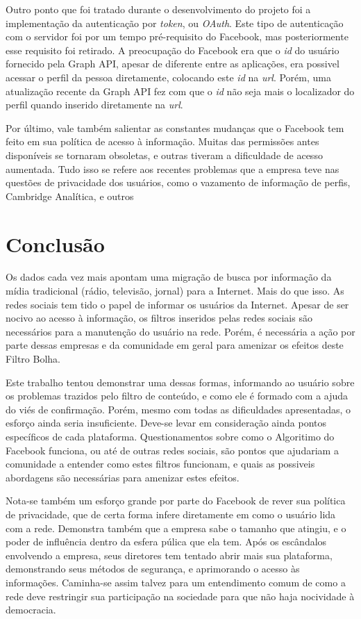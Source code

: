 \documentclass[
	12pt,				%
	oneside,			%
	a4paper,			%
	english,			%
	brazil				%
	]{abntex2ppgsi}
\begin{document}
Outro ponto que foi tratado durante o desenvolvimento do projeto foi a implementação da autenticação por \textit{token}, ou \textit{OAuth}. Este tipo de autenticação com o servidor foi por um tempo pré-requisito do Facebook, mas posteriormente esse requisito foi retirado. A preocupação do Facebook era que o \textit{id} do usuário fornecido pela Graph API, apesar de diferente entre as aplicações, era possivel acessar o perfil da pessoa diretamente, colocando este \textit{id} na \textit{url}. Porém, uma atualização recente da Graph API fez com que o \textit{id} não seja mais o localizador do perfil quando inserido diretamente na \textit{url}.

Por último, vale também salientar as constantes mudanças que o Facebook tem feito em sua política de acesso à informação. Muitas das permissões antes disponíveis se tornaram obsoletas, e outras tiveram a dificuldade de acesso aumentada. Tudo isso se refere aos recentes problemas que a empresa teve nas questões de privacidade dos usuários, como o vazamento de informação de perfis, Cambridge Analítica, e outros \cite{cambridge1,cambridge2,breach}

\chapter{Conclusão}

Os dados cada vez mais apontam uma migração de busca por informação da mídia tradicional (rádio, televisão, jornal) para a Internet. Mais do que isso. As redes sociais tem tido o papel de informar os usuários da Internet. Apesar de ser nocivo ao acesso à informação, os filtros inseridos pelas redes sociais são necessários para a manutenção do usuário na rede. Porém, é necessária a ação por parte dessas empresas e da comunidade em geral para amenizar os efeitos deste Filtro Bolha.

Este trabalho tentou demonstrar uma dessas formas, informando ao usuário sobre os problemas trazidos pelo filtro de conteúdo, e como ele é formado com a ajuda do viés de confirmação. Porém, mesmo com todas as dificuldades apresentadas, o esforço ainda seria insuficiente. Deve-se levar em consideração ainda pontos específicos de cada plataforma. Questionamentos sobre como o Algoritimo do Facebook funciona, ou até de outras redes sociais, são pontos que ajudariam a comunidade a entender como estes filtros funcionam, e quais as possiveis abordagens são necessárias para amenizar estes efeitos. 

Nota-se também um esforço grande por parte do Facebook de rever sua política de privacidade, que de certa forma infere diretamente em como o usuário lida com a rede. Demonstra também que a empresa sabe o tamanho que atingiu, e o poder de influência dentro da esfera púlica que ela tem. Após os escândalos envolvendo a empresa, seus diretores tem tentado abrir mais sua plataforma, demonstrando seus métodos de segurança, e aprimorando o acesso às informações. Caminha-se assim talvez para um entendimento comum de como a rede deve restringir sua participação na sociedade para que não haja nocividade à democracia.  
\end{document}
